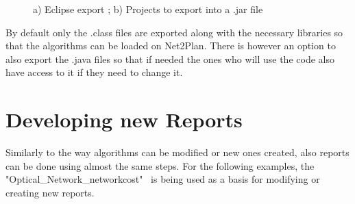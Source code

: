 	\begin{figure}[!h]
		\centering
		\caption{a) Eclipse export ; b) Projects to export into a .jar file}
	\end{figure}
	
	By default only the .class files are exported along with the necessary libraries so that the algorithms can be loaded on Net2Plan. There is however an option to also export the .java files so that if needed the ones who will use the code also have access to it if they need to change it.
	 						
	\newpage

	\section*{Developing new Reports}
	Similarly to the way algorithms can be modified or new ones created, also reports can be done using almost the same steps. For the following examples, the "Optical\_Network\_networkcost" \ is being used as a basis for modifying or creating new reports.

